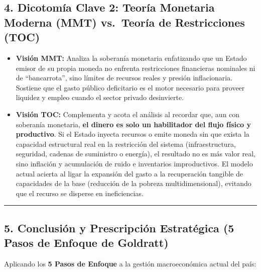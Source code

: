\documentclass[12pt,letterpaper]{article}
\providecommand{\tightlist}{%
  \setlength{\itemsep}{0pt}\setlength{\parskip}{0pt}}
\begin{document}
\hypertarget{dicotomuxeda-clave-2-teoruxeda-monetaria-moderna-mmt-vs.-teoruxeda-de-restricciones-toc}{%
\subsection{4. Dicotomía Clave 2: Teoría Monetaria Moderna (MMT)
vs.~Teoría de Restricciones
(TOC)}\label{dicotomuxeda-clave-2-teoruxeda-monetaria-moderna-mmt-vs.-teoruxeda-de-restricciones-toc}}

\begin{itemize}
\tightlist
\item
  \textbf{Visión MMT:} Analiza la soberanía monetaria enfatizando que un
  Estado emisor de su propia moneda no enfrenta restricciones
  financieras nominales ni de ``bancarrota'', sino límites de recursos
  reales y presión inflacionaria. Sostiene que el gasto público
  deficitario es el motor necesario para proveer liquidez y empleo
  cuando el sector privado desinvierte.
\item
  \textbf{Visión TOC:} Complementa y acota el análisis al recordar que,
  aun con soberanía monetaria, \textbf{el dinero es solo un habilitador
  del flujo físico y productivo}. Si el Estado inyecta recursos o emite
  moneda sin que exista la capacidad estructural real en la restricción
  del sistema (infraestructura, seguridad, cadenas de suministro o
  energía), el resultado no es más valor real, sino inflación y
  acumulación de ruido e inventarios improductivos. El modelo actual
  acierta al ligar la expansión del gasto a la recuperación tangible de
  capacidades de la base (reducción de la pobreza multidimensional),
  evitando que el recurso se disperse en ineficiencias.
\end{itemize}

\begin{center}\rule{0.5\linewidth}{0.5pt}\end{center}

\hypertarget{conclusiuxf3n-y-prescripciuxf3n-estratuxe9gica-5-pasos-de-enfoque-de-goldratt}{%
\subsection{5. Conclusión y Prescripción Estratégica (5 Pasos de Enfoque
de
Goldratt)}\label{conclusiuxf3n-y-prescripciuxf3n-estratuxe9gica-5-pasos-de-enfoque-de-goldratt}}

Aplicando los \textbf{5 Pasos de Enfoque} a la gestión macroeconómica
actual del país:
\end{document}
